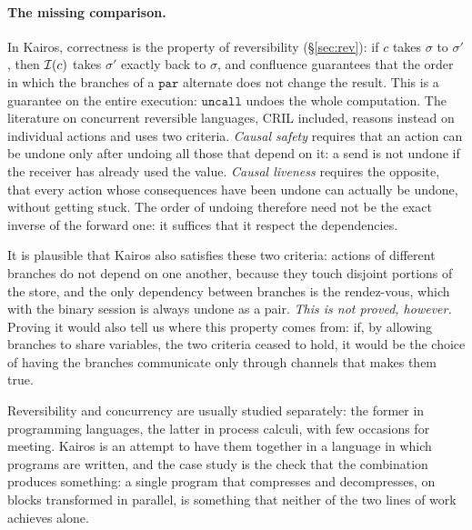\paragraph{The missing comparison.} In Kairos, correctness is the property of
reversibility (\S\ref{sec:rev}): if $c$ takes $\sigma$ to $\sigma'$, then
$\mathcal{I}(c)$ takes $\sigma'$ exactly back to $\sigma$, and confluence guarantees
that the order in which the branches of a $\mathtt{par}$ alternate does not change the
result. This is a guarantee on the entire execution: $\mathtt{uncall}$ undoes the whole
computation. The literature on concurrent reversible languages, CRIL included,
reasons instead on individual actions and uses two criteria. \emph{Causal safety}
requires that an action can be undone only after undoing all those that
depend on it: a send is not undone if the receiver has already used the value. \emph{Causal
liveness} requires the opposite, that every action whose consequences
have been undone can actually be undone, without getting stuck. The order
of undoing therefore need not be the exact inverse of the forward one:
it suffices that it respect the dependencies.

It is plausible that Kairos also satisfies these two criteria: actions of different
branches do not depend on one another, because they touch disjoint portions of the
store, and the only dependency between branches is the rendez-vous, which with the binary
session is always undone as a pair. \emph{This is not proved, however.} Proving it would
also tell us where this property comes from: if, by allowing branches to share
variables, the two criteria ceased to hold, it would be the choice of having the branches
communicate only through channels that makes them true.

\bigskip
\noindent
Reversibility and concurrency are usually studied separately: the former in
programming languages, the latter in process calculi, with few
occasions for meeting. Kairos is an attempt to have them together in a language
in which programs are written, and the case study is the check that
the combination produces something: a single program that compresses and decompresses,
on blocks transformed in parallel, is something that neither of the two lines of work
achieves alone.
